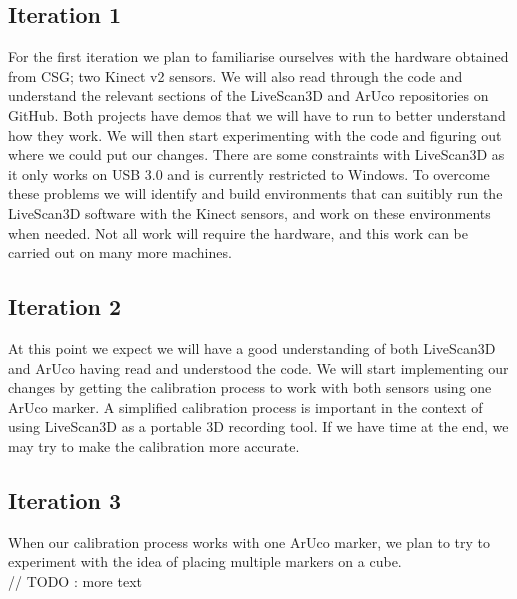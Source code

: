 \documentclass[a4paper,12pt]{article}
\begin{document}
\subsection*{Iteration 1}
For the first iteration we plan to familiarise ourselves with the hardware obtained from CSG; two Kinect v2 sensors. We will also read through the code and understand the relevant sections of the LiveScan3D and ArUco repositories on GitHub. Both projects have demos that we will have to run to better understand how they work. We will then start experimenting with the code and figuring out where we could put our changes.
There are some constraints with LiveScan3D as it only works on USB 3.0 and is currently restricted to Windows. To overcome these problems we will identify and build environments that can suitibly run the LiveScan3D software with the Kinect sensors, and work on these environments when needed. Not all work will require the hardware, and this work can be carried out on many more machines.
\\

\subsection*{Iteration 2}
\iffalse
The calibration process in LiveScan3D is currently a bit cumbersome. The idea is to use ArUco to simplify this, and also possibly make it more accurate. Yes, you can use multiple markers, maybe even arranged on 3D objects like cubes. We can discuss details on Wednesday. A simplified calibration process would be important in the context of using something like LiveScan3D as a portable 3D recording tool.
\fi
At this point we expect we will have a good understanding of both LiveScan3D and ArUco having read and understood the code. We will start implementing our changes by getting the calibration process to work with both sensors using one ArUco marker. A simplified calibration process is important in the context of using LiveScan3D as a portable 3D recording tool. If we have time at the end, we may try to make the calibration more accurate.  

\subsection*{Iteration 3}
When our calibration process works with one ArUco marker, we plan to try to experiment with the idea of placing multiple markers on a cube. \\
// TODO : more text
\end{document}
